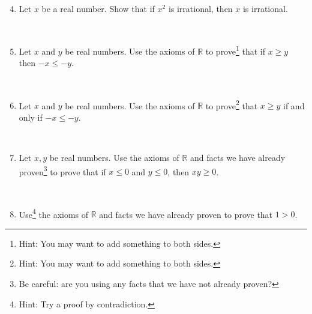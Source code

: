 \documentclass[12pt]{amsart}
\newcommand{\R}{\mathbb{R}}
\begin{document}
\begin{enumerate}\setcounter{enumi}{3}


\item Let $x$ be a real number. Show that if $x^2$ is irrational, then $x$ is irrational.

\

\item Let $x$ and $y$ be real numbers. Use the axioms of $\R$ to prove\footnote{Hint: You may want to add something to both sides.} that if $x \geq y$ then $-x \leq -y$.


\

\item Let $x$ and $y$ be real numbers. Use the axioms of $\R$ to prove\footnote{Hint: You may want to add something to both sides.} that $x \geq y$ if and only if $-x \leq -y$.


\

\item Let $x,y$ be real numbers. Use the axioms of $\R$ and facts we have already proven\footnote{Be careful: are you using any facts that we have not already proven?} to prove that if $x\leq 0$ and $y\leq 0$, then $xy\geq 0$. 

\



\item Use\footnote{Hint: Try a proof by contradiction.} the axioms of $\R$ and facts we have already proven to prove that $1>0$.


\end{enumerate}
\end{document}
